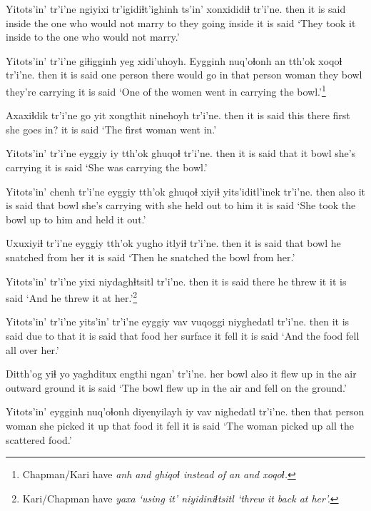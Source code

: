 \documentclass[12pt]{article}
\begin{document}
\gll Yitots'in' tr'i'ne ngiyixi tr'igidiɬt'ighinh   ts'in' xonxididiɬ  tr'i'ne.
then  {it is said} inside  {the one who would not marry} to {they going inside} {it is said}
\glt `They took it inside to the one who would not marry.'
\glend

\gll Yitots'in' tr'i'ne giɬigginh yeg xidi'uhoyh. Eygginh nuq'oɬonh an tth'ok xoqoɬ tr'i'ne.
then  {it is said} {one person} there {would go in} {that person} woman they bowl {they're carrying} {it is said}
\glt `One of the women went in carrying the bowl.'\footnote{Chapman/Kari have \em anh \em and \em ghiqoɬ \em instead of \em an \em and \em xoqoɬ.}
\glend

\gll Axaxiɬdik tr'i'ne go yit xongthit ninehoyh tr'i'ne.
then  {it is said} this there first {she goes in?} {it is said}
\glt `The first woman went in.'
\glend

\gll Yitots'in' tr'i'ne eyggiy iy tth'ok  ghuqoɬ tr'i'ne.
then  {it is said} that it bowl  {she's carrying} {it is said}
\glt `She was carrying the bowl.'
\glend

\gll Yitots'in' chenh tr'i'ne eyggiy  tth'ok  ghuqoɬ xiyiɬ yits'iditl'inek tr'i'ne.
then  also {it is said} that  bowl {she's carrying} with {she held out to him} {it is said}
\glt `She took the bowl up to him and held it out.'
\glend

\gll Uxuxiyiɬ tr'i'ne eyggiy tth'ok  {yugho itlyiɬ}  tr'i'ne.
then  {it is said} that bowl  {he snatched from her} {it is said}
\glt `Then he snatched the bowl from her.'
\glend

\gll Yitots'in' tr'i'ne yixi niydaghɬtsitl tr'i'ne.
then  {it is said} there {he threw it} {it is said}
\glt `And he threw it at her.'\footnote{Kari/Chapman have \em yaxa \em `using it' \em niyidiniɬtsitl \em `threw it back at her'.}
\glend

\gll Yitots'in' tr'i'ne yits'in' tr'i'ne eyggiy vav vuqoggi  niyghedatl tr'i'ne.
then  {it is said} {due to that} {it is said} that food {her surface} {it fell} {it is said}
\glt `And the food fell all over her.'
\glend

\gll Ditth'og yiɬ {yo yaghditux} engthi ngan'  tr'i'ne.
{her bowl} also {it flew up in the air} outward ground {it is said}
\glt `The bowl flew up in the air and fell on the ground.'
\glend

\gll Yitots'in' eygginh nuq'oɬonh diyenyilayh iy vav nighedatl tr'i'ne.
then  {that person} woman  {she picked it up} that food {it fell} {it is said}
\glt `The woman picked up all the scattered food.'
\glend
\end{document}
